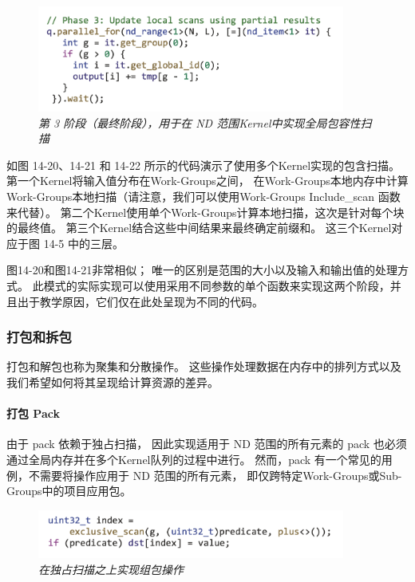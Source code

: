 \begin{figure}[H]
	\centering
	\includegraphics[width=0.9\textwidth]{figs/F14.22.png}
	\caption{\textit{第 3 阶段（最终阶段），用于在 ND 范围Kernel中实现全局包容性扫描 }}
\end{figure}

如图 14-20、14-21 和 14-22 所示的代码演示了使用多个Kernel实现的包含扫描。 
第一个Kernel将输入值分布在Work-Groups之间，
在Work-Groups本地内存中计算Work-Groups本地扫描（请注意，我们可以使用Work-Groups Include\_scan 函数来代替）。 
第二个Kernel使用单个Work-Groups计算本地扫描，这次是针对每个块的最终值。 
第三个Kernel结合这些中间结果来最终确定前缀和。 这三个Kernel对应于图 14-5 中的三层。

图14-20和图14-21非常相似； 唯一的区别是范围的大小以及输入和输出值的处理方式。 
此模式的实际实现可以使用采用不同参数的单个函数来实现这两个阶段，并且出于教学原因，它们仅在此处呈现为不同的代码。

\subsubsection{打包和拆包}
打包和解包也称为聚集和分散操作。 这些操作处理数据在内存中的排列方式以及我们希望如何将其呈现给计算资源的差异。

\paragraph{打包 Pack}

由于 pack 依赖于独占扫描，
因此实现适用于 ND 范围的所有元素的 pack 也必须通过全局内存并在多个Kernel队列的过程中进行。 
然而，pack 有一个常见的用例，不需要将操作应用于 ND 范围的所有元素，
即仅跨特定Work-Groups或Sub-Groups中的项目应用包。

\begin{figure}[H]
	\centering
	\includegraphics[width=0.9\textwidth]{figs/F14.23.png}
	\caption{\textit{在独占扫描之上实现组包操作 }}
\end{figure}

